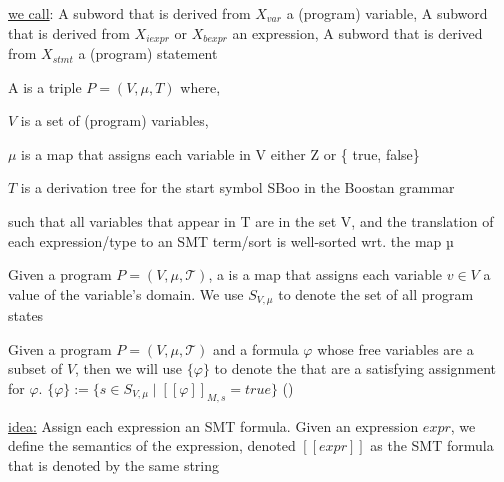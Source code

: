 \documentclass[landscape, a4paper]{article}
\begin{document}
\begin{minipage}[t]{0.2\linewidth}
\begin{betterlist}
		\begin{betterlist}
			\item \underline{we call}: A subword that is derived from $X_{var}$ a (program) \alert{variable}, A subword that is derived from $X_{iexpr}$ or $X_{bexpr}$ an \alert{expression}, A subword that is derived from $X_{stmt}$ a (program) \alert{statement}
		\end{betterlist}
	\end{betterlist}
	\begin{betterlist}
		\item A  is a triple $P = (V , \mu , T)$ where,
		\begin{betterlist}
			\item $V$ is a set of (program) variables,
			\item $\mu$  is a map that assigns each variable in V either Z or \{ true, false\}
			\item $T$ is a derivation tree for the start symbol SBoo in the Boostan grammar
		\end{betterlist}
		such that all variables that appear in T are in the set V, and the translation of each expression/type to an SMT term/sort is well-sorted wrt. the map µ
		\item {}
		\item {}
		\item Given a program $P = (V , \mu, \mathcal{T})$, a  is a map that assigns each variable $v \in V$ a value of the variable’s domain. We use $S_{V, \mu}$ to denote the set of all program states
		\begin{betterlist}
			\item Given a program $P = (V, \mu, \mathcal{T})$ and a formula $\varphi$ whose free variables are a subset of $V$, then we will use $\{\varphi\}$ to denote the  that are a satisfying assignment for $\varphi$. $\{ \varphi \}  := \{ s \in S_{V ,\mu} \mid [[\varphi ]]_{M,s} = true\}$ ()
		\end{betterlist}
		\item \script{171}{Semantics of Expressions}
		\begin{betterlist}
			\item \underline{idea:} Assign each expression an SMT formula. Given an expression $expr$, we define the semantics of the expression, denoted $[[expr]]$ as the SMT formula that is denoted by the same string

\end{betterlist}
\end{betterlist}
\end{minipage}
\end{document}
